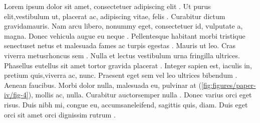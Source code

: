 \begin{sloppypar} %

Lorem  ipsum dolor sit amet, consectetuer adipiscing elit \cite{LIUDIMULYO201767}. Ut purus  elit,vestibulum ut, placerat ac, adipiscing vitae, felis . Curabitur dictum  gravidamauris. Nam arcu libero, nonummy eget, consectetuer id, vulputate a, magna. Donec vehicula augue eu neque \cite{liudimulyo_2018}. Pellentesque habitant morbi tristique senectuset netus et malesuada fames ac turpis egestas . Mauris ut leo. Cras viverra metusrhoncus sem \cite{2019liudimulyo}. Nulla et lectus vestibulum urna fringilla ultrices. Phasellus eutellus sit amet tortor gravida placerat . Integer sapien est, iaculis in, pretium quis,viverra ac, nunc. Praesent eget sem vel leo ultrices bibendum \cite{liudimulyo2020853}. Aenean faucibus. Morbi dolor nulla, malesuada eu, pulvinar at (\ref{fig:figures/paper-iv/fig-4}), mollis ac, nulla. Curabitur auctorsemper nulla . Donec varius orci eget risus. Duis nibh mi, congue eu, accumsaneleifend, sagittis quis, diam. Duis eget orci sit amet orci dignissim rutrum \cite{LIUDIMULYO201767,liudimulyo_2018,2019liudimulyo,liudimulyo2020853,liudimulyo_unpublished1,liudimulyo_unpublished2}.

\end{sloppypar}

